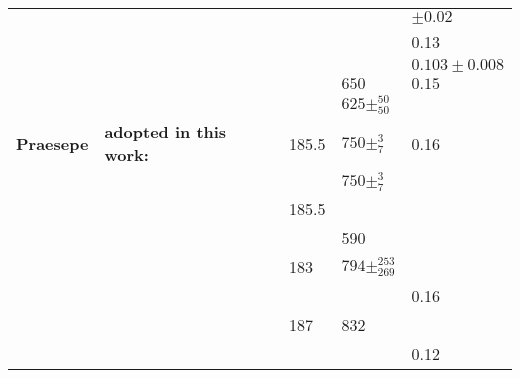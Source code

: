 \begin{table*}
\begin{tabular}{lllll}
       &             \citet{liu2016}        &               &                                      &  $               \pm 0.02  $ \\
       &             \citet{netopil_metallicities_2016}    &               &                                      &               0.13           \\
       &             \citet{taylor2005}  &               &                                      &  $ 0.103         \pm 0.008 $ \\
       &            \citet{salaris_age_2004}    &               &  $650$                               &  $ 0.15$                      \\
       &             \citet{perryman1998}    &               &  $ 625       \pm _{ 50}^{50       }$ &                              \\\hline
\textbf{Praesepe} & \textbf{adopted in this work:}   &     185.5     &  $ 750\pm _{7}^{ 3 }$                &              0.16            \\
     &               \citet{bossini2019}     &               &                 $ 750\pm _{7}^{ 3 }$ &                              \\
     &            \citet{cantat_gaudin_2018} &     185.5     &                                      &                              \\
     &               \citet{gossage2018}     &               &                           590        &                              \\
     &             \citet{yen2018}           &     183       &  $ 794       \pm _{ 269}^{253     }$ &                              \\
     &\citet{netopil_metallicities_2016}     &               &                                      &               0.16           \\
     &             \citet{scholz2015}    &     187       &                           832        &                              \\
     &             \citet{boesgaard2013}   &               &                                      &               0.12           \\

\end{tabular}
\end{table*}
